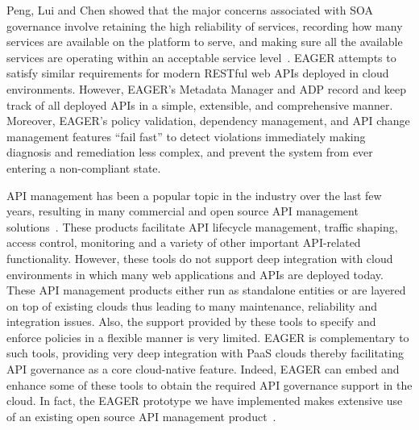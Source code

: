 Peng, Lui and Chen showed that
the major concerns associated with SOA governance 
involve retaining the high reliability of services, recording how many services
are available on the platform to serve, and making sure all the available 
services are operating within an acceptable service
level~\cite{4730489}. EAGER attempts to satisfy similar requirements for 
modern RESTful web APIs deployed in cloud environments. 
However, EAGER's Metadata Manager and ADP record and keep track of all deployed APIs 
in a simple, extensible, and comprehensive manner.  Moreover, EAGER's policy
validation, dependency management, and API change management features 
``fail fast'' to detect violations immediately making
diagnosis and remediation less complex, and prevent
the system from ever entering a non-compliant state.

API management has been a popular topic in the industry over the last few years, resulting
in many commercial and open source API management solutions~\cite{wso2am,apigee,layer7,mashery}. These products facilitate
API lifecycle management, traffic shaping, access control, monitoring and a variety of other
important API-related functionality. However, these tools do not support deep integration with
cloud environments in which many web applications and APIs are deployed today. These API
management products either run as standalone entities or are layered on top of existing clouds
thus leading to many maintenance, reliability and integration issues. Also, the support provided by these
tools to specify and enforce policies in a flexible manner is very limited. EAGER is complementary
to such tools, providing very deep integration with PaaS clouds thereby facilitating API governance
as a core cloud-native feature. Indeed, EAGER can embed and enhance some of these tools to
obtain the required API governance support in the cloud. In fact, the EAGER prototype we have
implemented makes extensive use of an existing open source API management product~\cite{wso2am}.